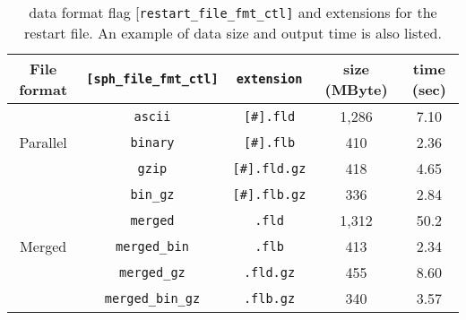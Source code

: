 %
%
\begin{table}[htp]
\caption{data format flag {[\tt restart\_file\_fmt\_ctl]} and extensions for the restart file. An example of data size and output time is also listed.}
\begin{center} 
\begin{tabular}{|c|c|c|c|c|}
\hline
File format & \verb|[sph_file_fmt_ctl]|  & \verb|extension| & size (MByte) & time (sec)  \\ \hline \hline
              &  \verb|ascii| & \verb|[#].fld|  & 1,286 & 7.10 \\
Parallel  &  \verb|binary| & \verb|[#].flb|  & 410 & 2.36 \\
              &  \verb|gzip| &  \verb|[#].fld.gz| & 418 &  4.65 \\
              &  \verb|bin_gz| &\verb|[#].flb.gz| & 336 &  2.84 \\ \hline
              & \verb|merged|  &  \verb|.fld| & 1,312 & 50.2 \\
Merged  &  \verb|merged_bin| &  \verb|.flb| & 413 &  2.34 \\
              &  \verb|merged_gz| &  \verb|.fld.gz| & 455 & 8.60 \\
              &  \verb|merged_bin_gz| &  \verb|.flb.gz| & 340 & 3.57 \\ \hline
\end{tabular}
\end{center}
\label{table:restart_format}
\end{table}
%
%
\newpage
